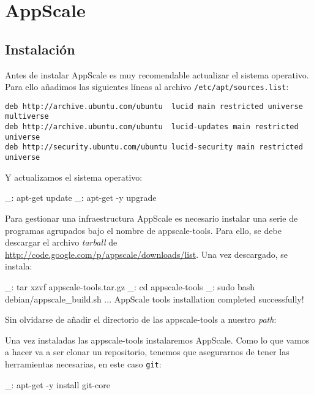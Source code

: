 \chapter{AppScale}
\label{anx:appscale}


\section{Instalación}

Antes de instalar AppScale es muy recomendable actualizar el sistema operativo. Para ello añadimos las siguientes líneas al archivo \texttt{/etc/apt/sources.list}:

\begin{lstlisting}
deb http://archive.ubuntu.com/ubuntu  lucid main restricted universe multiverse
deb http://archive.ubuntu.com/ubuntu  lucid-updates main restricted universe
deb http://security.ubuntu.com/ubuntu lucid-security main restricted universe
\end{lstlisting}

Y actualizamos el sistema operativo:

\begin{bashcode}
_: apt-get update
_: apt-get -y upgrade
\end{bashcode}

Para gestionar una infraestructura AppScale es necesario instalar una serie de programas agrupados bajo el nombre de appscale-tools. Para ello, se debe descargar el archivo \emph{tarball} de \url{http://code.google.com/p/appscale/downloads/list}. Una vez descargado, se instala:

\begin{bashcode}
_: tar xzvf appscale-tools.tar.gz
_: cd appscale-tools
_: sudo bash debian/appscale_build.sh
...
AppScale tools installation completed successfully!
\end{bashcode}

Sin olvidarse de añadir el directorio de las appscale-tools a nuestro \emph{path}:


Una vez instaladas las appscale-tools instalaremos AppScale. Como lo que vamos a hacer va a ser clonar un repositorio, tenemos que asegurarnos de tener las herramientas necesarias, en este caso \texttt{git}:

\begin{bashcode}
_: apt-get -y install git-core
\end{bashcode}

